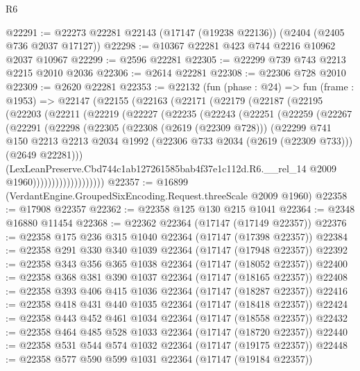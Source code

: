 \begin{lexlean}{R6}
\begin{coremodule}
@22291 := @22273 @22281 @22143 (@17147 (@19238 @22136)) (@2404 (@2405 @736 @2037 @17127))
@22298 := @10367 @22281 @423 @744 @2216 @10962 @2037 @10967
@22299 := @2596 @22281
@22305 := @22299 @739 @743 @2213 @2215 @2010 @2036
@22306 := @2614 @22281
@22308 := @22306 @728 @2010
@22309 := @2620 @22281
@22353 := @22132
    (fun (phase : @24) =>
    fun (frame : @1953) =>
    @22147
      (@22155
        (@22163
          (@22171
            (@22179
              (@22187
                (@22195
                  (@22203
                    (@22211
                      (@22219
                        (@22227
                          (@22235
                            (@22243
                              (@22251
                                (@22259
                                  (@22267
                                    (@22291
                                      (@22298
                                        (@22305
                                          (@22308 (@2619 (@22309 @728)))
                                          (@22299
                                            @741
                                            @150
                                            @2213
                                            @2213
                                            @2034
                                            @1992
                                            (@22306 @733 @2034 (@2619 (@22309 @733)))
                                            (@2649 @22281)))
                                        (LexLeanPreserve.Cbd744c1ab127261585bab4f37e1c112d.R6.__rel_14
                                          @2009
                                          @1960)))))))))))))))))))
@22357 := @16899 (VerdantEngine.GroupedSixEncoding.Request.threeScale @2009 @1960)
@22358 := @17908 @22357
@22362 := @22358 @125 @130 @215 @1041
@22364 := @2348 @16880 @11454
@22368 := @22362 @22364 (@17147 (@17149 @22357))
@22376 := @22358 @175 @236 @315 @1040 @22364 (@17147 (@17398 @22357))
@22384 := @22358 @291 @330 @340 @1039 @22364 (@17147 (@17948 @22357))
@22392 := @22358 @343 @356 @365 @1038 @22364 (@17147 (@18052 @22357))
@22400 := @22358 @368 @381 @390 @1037 @22364 (@17147 (@18165 @22357))
@22408 := @22358 @393 @406 @415 @1036 @22364 (@17147 (@18287 @22357))
@22416 := @22358 @418 @431 @440 @1035 @22364 (@17147 (@18418 @22357))
@22424 := @22358 @443 @452 @461 @1034 @22364 (@17147 (@18558 @22357))
@22432 := @22358 @464 @485 @528 @1033 @22364 (@17147 (@18720 @22357))
@22440 := @22358 @531 @544 @574 @1032 @22364 (@17147 (@19175 @22357))
@22448 := @22358 @577 @590 @599 @1031 @22364 (@17147 (@19184 @22357))

\end{coremodule}
\end{lexlean}
